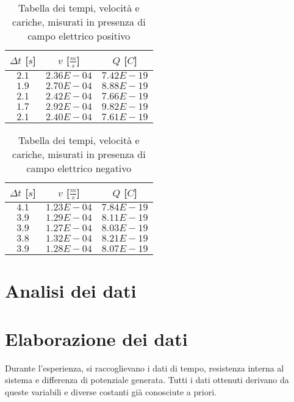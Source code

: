 \documentclass{article}
\begin{document}
\begin{multicols}{2}

\begin{table}[H]
	\centering
	\begin{tabular}{| c | c | c |}
		\hline
		$\Delta t$ [$s$] & $v$ [$\frac ms$] & $Q$ [$C$] \\
		\hline
		$2.1$ & $2.36E-04$ & $7.42E-19$ \\
		$1.9$ & $2.70E-04$ & $8.88E-19$ \\
		$2.1$ & $2.42E-04$ & $7.66E-19$ \\
		$1.7$ & $2.92E-04$ & $9.82E-19$ \\
		$2.1$ & $2.40E-04$ & $7.61E-19$ \\
		\hline
	\end{tabular}
	\caption{Tabella dei tempi, velocità e cariche, misurati in presenza di campo elettrico positivo}
	\label{}
\end{table}

\columnbreak

\begin{table}[H]
	\centering
	\begin{tabular}{| c | c | c |}
		\hline
		$\Delta t$ [$s$] & $v$ [$\frac ms$] & $Q$ [$C$] \\
		\hline
		$4.1$ & $1.23E-04$ & $7.84E-19$ \\
		$3.9$ & $1.29E-04$ & $8.11E-19$ \\
		$3.9$ & $1.27E-04$ & $8.03E-19$ \\
		$3.8$ & $1.32E-04$ & $8.21E-19$ \\
		$3.9$ & $1.28E-04$ & $8.07E-19$ \\
		\hline		
	\end{tabular}
	\caption{Tabella dei tempi, velocità e cariche, misurati in presenza di campo elettrico negativo}
	\label{}
\end{table}
	
\end{multicols}

\section{Analisi dei dati}

\section{Elaborazione dei dati}
Durante l'esperienza, si raccoglievano i dati di tempo, resistenza interna al sistema e differenza di potenziale generata. Tutti i dati ottenuti derivano da queste variabili e diverse costanti già conosciute a priori.
\end{document}

